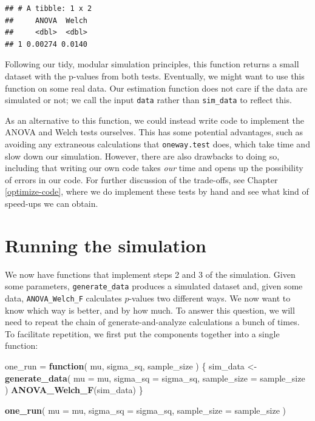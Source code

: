 \documentclass[
]{book}
\newenvironment{Shaded}{\begin{snugshade}}{\end{snugshade}}
\newcommand{\AttributeTok}[1]{\textcolor[rgb]{0.13,0.29,0.53}{#1}}
\newcommand{\ControlFlowTok}[1]{\textcolor[rgb]{0.13,0.29,0.53}{\textbf{#1}}}
\newcommand{\FunctionTok}[1]{\textcolor[rgb]{0.13,0.29,0.53}{\textbf{#1}}}
\newcommand{\NormalTok}[1]{#1}
\newcommand{\OtherTok}[1]{\textcolor[rgb]{0.56,0.35,0.01}{#1}}
\begin{document}
\begin{verbatim}
## # A tibble: 1 x 2
##     ANOVA  Welch
##     <dbl>  <dbl>
## 1 0.00274 0.0140
\end{verbatim}

Following our tidy, modular simulation principles, this function returns a small dataset with the p-values from both tests.
Eventually, we might want to use this function on some real data.
Our estimation function does not care if the data are simulated or not; we call the input \texttt{data} rather than \texttt{sim\_data} to reflect this.

As an alternative to this function, we could instead write code to implement the ANOVA and Welch tests ourselves.
This has some potential advantages, such as avoiding any extraneous calculations that \texttt{oneway.test} does, which take time and slow down our simulation.
However, there are also drawbacks to doing so, including that writing our own code takes \emph{our} time and opens up the possibility of errors in our code.
For further discussion of the trade-offs, see Chapter \ref{optimize-code}, where we do implement these tests by hand and see what kind of speed-ups we can obtain.

\section{Running the simulation}\label{running-the-simulation}

We now have functions that implement steps 2 and 3 of the simulation.
Given some parameters, \texttt{generate\_data} produces a simulated dataset and, given some data, \texttt{ANOVA\_Welch\_F} calculates \(p\)-values two different ways.
We now want to know which way is better, and by how much.
To answer this question, we will need to repeat the chain of generate-and-analyze calculations a bunch of times.
To facilitate repetition, we first put the components together into a single function:

\begin{Shaded}
\begin{Highlighting}[]
\NormalTok{one\_run }\OtherTok{=} \ControlFlowTok{function}\NormalTok{( mu, sigma\_sq, sample\_size ) \{}
\NormalTok{  sim\_data }\OtherTok{\textless{}{-}} \FunctionTok{generate\_data}\NormalTok{(}
    \AttributeTok{mu =}\NormalTok{ mu, }
    \AttributeTok{sigma\_sq =}\NormalTok{ sigma\_sq,}
    \AttributeTok{sample\_size =}\NormalTok{ sample\_size}
\NormalTok{  )}
  \FunctionTok{ANOVA\_Welch\_F}\NormalTok{(sim\_data)}
\NormalTok{\}}

\FunctionTok{one\_run}\NormalTok{( }\AttributeTok{mu =}\NormalTok{ mu, }\AttributeTok{sigma\_sq =}\NormalTok{ sigma\_sq, }\AttributeTok{sample\_size =}\NormalTok{ sample\_size )}
\end{Highlighting}
\end{Shaded}
\end{document}

